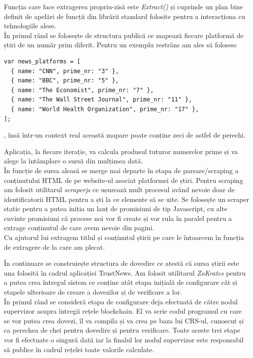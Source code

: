 Funcția care face extragerea propriu-zisă este \textit{Extract()} \cite{TrustNews_Extract} și cuprinde un plan bine definit de apelări de funcții din librării standard folosite pentru a interacționa cu tehnologiile alese.\\

În primul rând se folosește de structura publică ce mapează fiecare platformă de știri de un număr prim diferit. Pentru un exemplu restrâns am ales să folosesc
\begin{verbatim}
var news_platforms = [
  { name: "CNN", prime_nr: "3" },
  { name: "BBC", prime_nr: "5" },
  { name: "The Economist", prime_nr: "7" },
  { name: "The Wall Street Journal", prime_nr: "11" },
  { name: "World Health Organization", prime_nr: "17" },
];
\end{verbatim}
, însă într-un context real această mapare poate conține zeci de astfel de perechi.

Aplicația, la fiecare iterație, va calcula produsul tuturor numerelor prime și va alege la întâmplare o sursă din mulțimea dată.\\

În funcție de sursa aleasă se merge mai departe în etapa de parsare/scraping a conținutului HTML de pe website-ul asociat platformei de știri. Pentru scraping am folosit utilitarul \textit{scraperjs} \cite{scraperjs} ce ușurează mult procesul având nevoie doar de identificatorii HTML pentru a ști la ce elemente să se uite. Se folosește un scraper static pentru a putea iniția un lanț de promisiuni de tip Javascript, cu alte cuvinte promisiuni că procese noi vor fi create și vor rula în paralel pentru a extrage conținutul de care avem nevoie din pagini.\\

Cu ajutorul lui extragem titlul și conținutul știrii pe care le întoarcem în funcția de extragere de la care am plecat.\\

\clearpage

În continuare se construiește structura de dovedire ce atestă că sursa știrii este una folosită în cadrul aplicației TrustNews. Am folosit utilitarul \textit{ZoKrates} \cite{zokrates} pentru a putea crea întregul sistem ce conține atât etapa inițială de configurare cât și etapele ulterioare de creare a dovezilor și de verificare a lor.\\

În primul rând se consideră etapa de configurare deja efectuată de către nodul supervizor asupra întregii rețele blockchain. El va scrie codul programul cu care se vor putea crea dovezi, îl va compila și va crea pe baza lui CRS-ul, cunoscut și ca perechea de chei pentru dovedire și pentru verificare. Toate aceste trei etape vor fi efectuate o singură dată iar la finalul lor nodul supervizor este responsabil să publice în cadrul rețelei toate valorile calculate.\\

